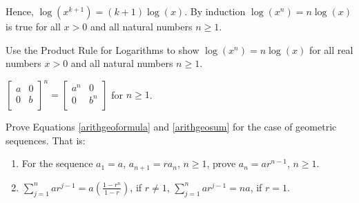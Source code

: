 \documentclass{ximera}
\begin{document}
\begin{question}
\begin{problem}
\begin{solution}
 Hence, $\log\left(x^{k+1}\right) = (k+1) \log(x)$.  By induction  $\log\left(x^n \right) = n \log(x)$ is true for all $x>0$ and all natural numbers $n \geq 1$.
\end{solution}
\end{problem}

\begin{problem}
    Use the Product Rule for Logarithms to show $\log\left(x^{n}\right) = n \log(x)$ for all real numbers $x > 0$ and all natural numbers $n \geq 1$.
\end{problem}

\begin{problem}\label{proofindlast}
    $\left[ \begin{array}{cc} a & 0 \\ 0 & b \\ \end{array} \right]^{n} = \left[ \begin{array}{cc} a^{n} & 0 \\ 0 & b^{n} \\ \end{array} \right]$ for $n \geq 1$.
\end{problem}

\end{question}

\begin{problem}
    
Prove Equations \ref{arithgeoformula} and \ref{arithgeosum} for the case of geometric sequences.  That is:

\begin{enumerate}

\item \label{proofgeosequeneex} For the sequence  $a_1 = a$, $a_{n+1} = r a_{n}$, $n \geq 1$, prove $a_{n} = ar^{n-1}$, $n \geq 1$.

\item  \label{proofgeosumex} $\displaystyle{\sum_{j=1}^{n} a r^{j-1} = a \left( \frac{1-r^n}{1-r}\right)}$, if $r \neq 1$, $\displaystyle{\sum_{j=1}^{n} a r^{j-1} = na}$, if $r=1$.

\end{enumerate}

\end{problem}
\end{document}
